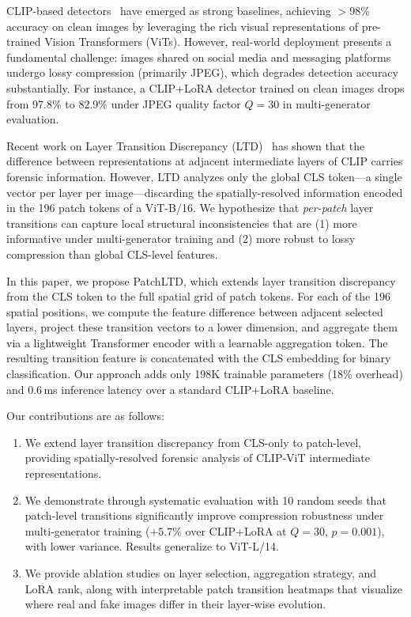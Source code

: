 \documentclass[runningheads]{llncs}
\newcommand{\ours}{PatchLTD}
\begin{document}
CLIP-based detectors~\cite{ojha2023universalfakedetector,koutlis2024rine} have emerged as strong baselines, achieving $>$98\% accuracy on clean images by leveraging the rich visual representations of pre-trained Vision Transformers (ViTs).
However, real-world deployment presents a fundamental challenge: images shared on social media and messaging platforms undergo lossy compression (primarily JPEG), which degrades detection accuracy substantially.
For instance, a CLIP+LoRA detector trained on clean images drops from 97.8\% to 82.9\% under JPEG quality factor $Q{=}30$ in multi-generator evaluation.

Recent work on Layer Transition Discrepancy (LTD)~\cite{yang2026ltd} has shown that the difference between representations at adjacent intermediate layers of CLIP carries forensic information.
However, LTD analyzes only the global CLS token---a single vector per layer per image---discarding the spatially-resolved information encoded in the 196 patch tokens of a ViT-B/16.
We hypothesize that \emph{per-patch} layer transitions can capture local structural inconsistencies that are (1) more informative under multi-generator training and (2) more robust to lossy compression than global CLS-level features.

In this paper, we propose \ours{}, which extends layer transition discrepancy from the CLS token to the full spatial grid of patch tokens.
For each of the 196 spatial positions, we compute the feature difference between adjacent selected layers, project these transition vectors to a lower dimension, and aggregate them via a lightweight Transformer encoder with a learnable aggregation token.
The resulting transition feature is concatenated with the CLS embedding for binary classification.
Our approach adds only 198K trainable parameters (18\% overhead) and 0.6\,ms inference latency over a standard CLIP+LoRA baseline.

Our contributions are as follows:
\begin{enumerate}
    \item We extend layer transition discrepancy from CLS-only to patch-level, providing spatially-resolved forensic analysis of CLIP-ViT intermediate representations.
    \item We demonstrate through systematic evaluation with 10 random seeds that patch-level transitions significantly improve compression robustness under multi-generator training ($+5.7\%$ over CLIP+LoRA at $Q{=}30$, $p{=}0.001$), with lower variance. Results generalize to ViT-L/14.
    \item We provide ablation studies on layer selection, aggregation strategy, and LoRA rank, along with interpretable patch transition heatmaps that visualize where real and fake images differ in their layer-wise evolution.
\end{enumerate}
\end{document}
